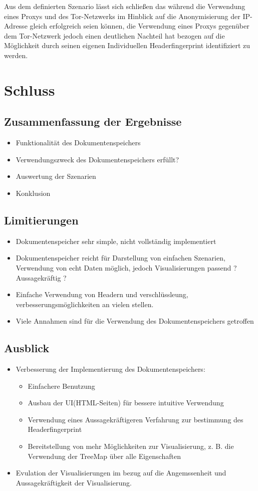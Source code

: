 \documentclass[
    fontsize=12pt,
    headings=small,
    parskip=half,           %
    bibliography=totoc,
    numbers=noenddot,       %
    open=any,               %
    ]{scrreprt}
\begin{document}
Aus dem definierten Szenario lässt sich schließen das während die Verwendung eines Proxys und des Tor-Netzwerks im Hinblick auf die Anonymisierung der IP-Adresse gleich erfolgreich seien können, die Verwendung eines Proxys gegenüber dem Tor-Netzwerk jedoch einen deutlichen Nachteil hat bezogen auf die Möglichkeit durch seinen eigenen Individuellen Headerfingerprint identifiziert zu werden.

\chapter{Schluss}
\section{Zusammenfassung der Ergebnisse}
\begin{itemize}
\item Funktionalität des Dokumentenspeichers
\item Verwendungszweck des Dokumentenspeichers erfüllt?
\item Auswertung der Szenarien
\item Konklusion
\end{itemize}

\section{Limitierungen}
\begin{itemize}
\item Dokumentenspeicher sehr simple, nicht vollständig implementiert
\item Dokumentenspeicher reicht für Darstellung von einfachen Szenarien, Verwendung von echt Daten möglich, jedoch Visualisierungen passend ? Aussagekräftig ?
\item Einfache Verwendung von Headern und verschlüssleung, verbesserungsmöglichkeiten an vielen stellen.
\item Viele Annahmen sind für die Verwendung des Dokumentenspeichers getroffen
\end{itemize}

\section{Ausblick}
\begin{itemize}
\item Verbesserung der Implementierung des Dokumentenspeichers: 
    \begin{itemize}
    \item Einfachere Benutzung
    \item Ausbau der UI(HTML-Seiten) für bessere intuitive Verwendung
    \item Verwendung eines Aussagekräftigeren Verfahrung zur bestimmung des Headerfingerprint
    \item Bereitstellung von mehr Möglichkeiten zur Visualisierung, z. B. die Verwendung der TreeMap über alle Eigenschaften 
    \end{itemize}
\item Evulation der Visualisierungen im bezug auf die Angemssenheit und Aussagekräftigkeit der Visualisierung.
\end{itemize}
\end{document}
